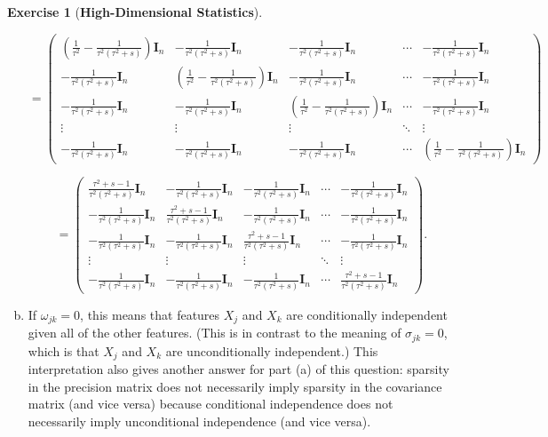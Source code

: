 \documentclass{article}
\theoremstyle{definition}
\newtheorem{exercise}{Exercise}
\theoremstyle{definition}
\theoremstyle{definition}
\theoremstyle{definition}
\theoremstyle{definition}
\begin{document}
\begin{exercise}[\textbf{High-Dimensional Statistics}]
\begin{enumerate}[(a)]
\[
=  \begin{pmatrix}
\left( \frac{1}{\tau^2} - \frac{1}{\tau^2(\tau^2 + s)} \right) \boldsymbol{I}_n & - \frac{1}{\tau^2(\tau^2 +s)} \boldsymbol{I}_n & - \frac{1}{\tau^2(\tau^2 +s)} \boldsymbol{I}_n & \cdots & - \frac{1}{\tau^2(\tau^2 +s)} \boldsymbol{I}_n \\
- \frac{1}{\tau^2(\tau^2 +s)} \boldsymbol{I}_n & \left( \frac{1}{\tau^2} - \frac{1}{\tau^2(\tau^2 + s)} \right) \boldsymbol{I}_n &  - \frac{1}{\tau^2(\tau^2 +s)} \boldsymbol{I}_n & \cdots & - \frac{1}{\tau^2(\tau^2 +s)} \boldsymbol{I}_n \\
- \frac{1}{\tau^2(\tau^2 +s)} \boldsymbol{I}_n &  - \frac{1}{\tau^2(\tau^2 +s)} \boldsymbol{I}_n & \left( \frac{1}{\tau^2} - \frac{1}{\tau^2(\tau^2 + s)} \right) \boldsymbol{I}_n  & \cdots & - \frac{1}{\tau^2(\tau^2 +s)} \boldsymbol{I}_n \\
\vdots & \vdots & \vdots & \ddots & \vdots \\
- \frac{1}{\tau^2(\tau^2 +s)} \boldsymbol{I}_n &  - \frac{1}{\tau^2(\tau^2 +s)} \boldsymbol{I}_n & - \frac{1}{\tau^2(\tau^2 +s)} \boldsymbol{I}_n  & \cdots  & \left( \frac{1}{\tau^2} - \frac{1}{\tau^2(\tau^2 + s)} \right) \boldsymbol{I}_n
\end{pmatrix}
\]

\[
=  \begin{pmatrix}
\frac{\tau^2+s - 1}{\tau^2(\tau^2 +s)} \boldsymbol{I}_n & - \frac{1}{\tau^2(\tau^2 +s)} \boldsymbol{I}_n & - \frac{1}{\tau^2(\tau^2 +s)} \boldsymbol{I}_n & \cdots & - \frac{1}{\tau^2(\tau^2 +s)} \boldsymbol{I}_n \\
- \frac{1}{\tau^2(\tau^2 +s)} \boldsymbol{I}_n & \frac{\tau^2+s-1}{\tau^2(\tau^2 +s)} \boldsymbol{I}_n &  - \frac{1}{\tau^2(\tau^2 +s)} \boldsymbol{I}_n & \cdots & - \frac{1}{\tau^2(\tau^2 +s)} \boldsymbol{I}_n \\
- \frac{1}{\tau^2(\tau^2 +s)} \boldsymbol{I}_n &  - \frac{1}{\tau^2(\tau^2 +s)} \boldsymbol{I}_n & \frac{\tau^2+s-1}{\tau^2(\tau^2 +s)} \boldsymbol{I}_n  & \cdots & - \frac{1}{\tau^2(\tau^2 +s)} \boldsymbol{I}_n \\
\vdots & \vdots & \vdots & \ddots & \vdots \\
- \frac{1}{\tau^2(\tau^2 +s)} \boldsymbol{I}_n &  - \frac{1}{\tau^2(\tau^2 +s)} \boldsymbol{I}_n & - \frac{1}{\tau^2(\tau^2 +s)} \boldsymbol{I}_n  & \cdots  & \frac{\tau^2+s-1}{\tau^2(\tau^2 +s)} \boldsymbol{I}_n
\end{pmatrix}.
\]


\item If \(\omega_{jk}=0\), this means that features \(X_j\) and \(X_k\) are conditionally independent given all of the other features. (This is in contrast to the meaning of \(\sigma_{jk}= 0\), which is that \(X_j\) and \(X_k\) are unconditionally independent.) This interpretation also gives another answer for part (a) of this question: sparsity in the precision matrix does not necessarily imply sparsity in the covariance matrix (and vice versa) because conditional independence does not necessarily imply unconditional independence (and vice versa). 


\end{enumerate}
\end{exercise}
\end{document}
